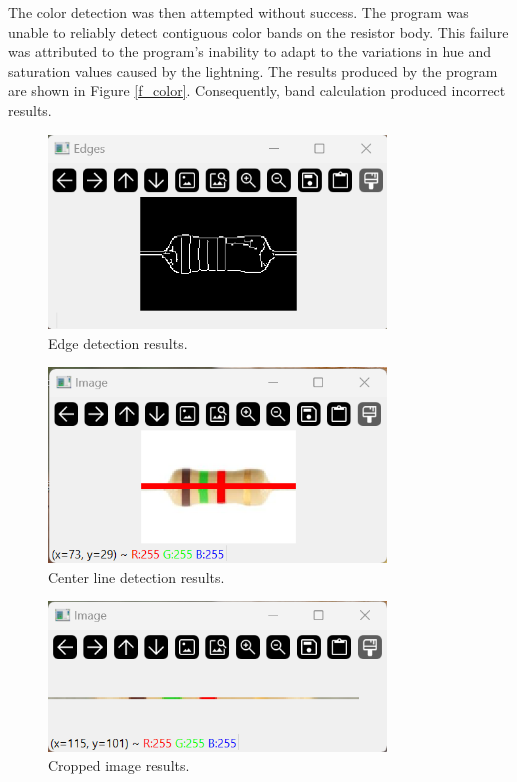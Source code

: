 \documentclass[preprint,12pt,3p,times]{elsarticle}
\begin{document}
The color detection was then attempted without success. The program was unable to reliably detect contiguous color bands on the resistor body. This failure was attributed to the program's inability to adapt to the variations in hue and saturation values caused by the lightning. The results produced by the program are shown in Figure \ref{f_color}. Consequently, band calculation produced incorrect results.

\begin{figure}[!h]
    \centering
    \includegraphics[width=0.8\textwidth]{screen2.png}
    \caption{\label{f_edge}Edge detection results.}
\end{figure}

\begin{figure}[!h]
    \centering
    \includegraphics[width=0.8\textwidth]{screen3.png}
    \caption{\label{f_center}Center line detection results.}
\end{figure}

\begin{figure}[!h]
    \centering
    \includegraphics[width=0.8\textwidth]{screen4.png}
    \caption{\label{f_cropped}Cropped image results.}
\end{figure}
\end{document}
